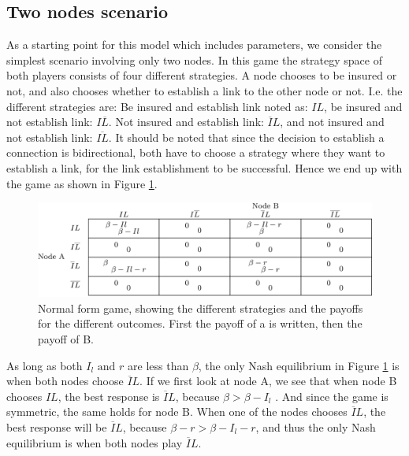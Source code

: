 \subsection{Two nodes scenario}
As a starting point for this model which includes parameters, we consider the simplest scenario involving only two nodes. In this game the strategy space of both players consists of four different strategies. A node chooses to be insured or not, and also chooses whether to establish a link to the other node or not. I.e. the different strategies are: Be insured and establish link noted as: $IL$, 
be insured and not establish link: $I\overline{L}$. Not insured and establish link: $\overline{I}L$, and not insured and not establish link: $\overline{IL}$. It should be noted that since the decision to establish a connection is bidirectional, both have to choose a strategy where they want to establish a link, for the link establishment to be successful. Hence we end up with the game as shown in Figure \ref{fig:FirstGameTheoryModel}.

\begin{figure} 
\centering
\includegraphics[width=1.0\textwidth]{../Figures/FirstGameWithParameters.png}
\caption[Normal form game, showing the different strategies and the payoffs for the different outcomes.]{\label{fig:FirstGameTheoryModel} Normal form game, showing the different strategies and the payoffs for the different outcomes. First the payoff of a is written, then the payoff of B.}
\end{figure}

As long as both $I_{l} \text{ and } r$ are less than $\beta$, the only Nash equilibrium in Figure \ref{fig:FirstGameTheoryModel} is when both nodes choose $\overline{I}L$. If we first look at node A, we see that when node B chooses $IL$, the best response is $\overline{I}L$, because $ \beta >\beta- I_{l}$ . And since the game is symmetric, the same holds for node B. 
When one of the nodes chooses $\overline{I}L$, the best response will be $\overline{I}L$, because $\beta - r>\beta - I_{l} - r  $, and thus the only Nash equilibrium is when both nodes play $\overline{I}L$.

